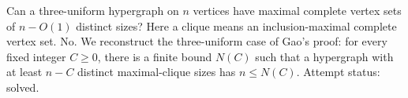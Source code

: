 Can a three-uniform hypergraph on \(n\) vertices have maximal complete vertex sets of \(n-O(1)\) distinct sizes? Here a clique means an inclusion-maximal complete vertex set.
No. We reconstruct the three-uniform case of Gao's proof: for every fixed integer \(C\geq0\), there is a finite bound \(N(C)\) such that a hypergraph with at least \(n-C\) distinct maximal-clique sizes has \(n\leq N(C)\). Attempt status: solved.
